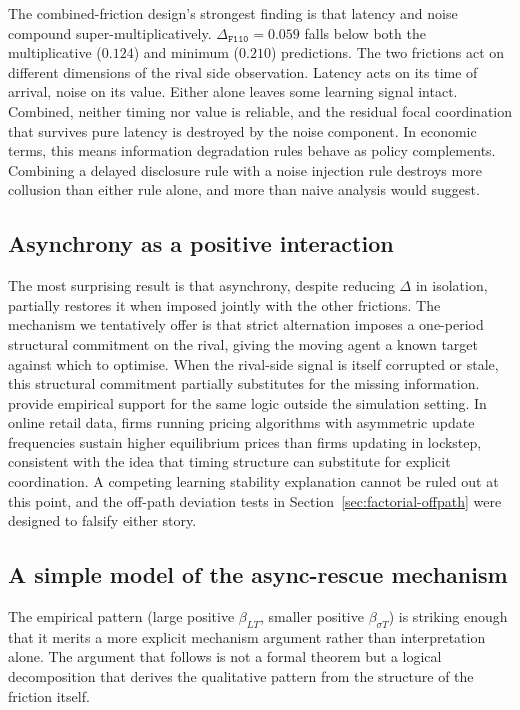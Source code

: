 The combined-friction design's strongest finding is that latency and noise compound super-multiplicatively. $\Delta_{\texttt{F110}} = 0.059$ falls below both the multiplicative ($0.124$) and minimum ($0.210$) predictions. The two frictions act on different dimensions of the rival side observation. Latency acts on its time of arrival, noise on its value. Either alone leaves some learning signal intact. Combined, neither timing nor value is reliable, and the residual focal coordination that survives pure latency is destroyed by the noise component. In economic terms, this means information degradation rules behave as policy complements. Combining a delayed disclosure rule with a noise injection rule destroys more collusion than either rule alone, and more than naive analysis would suggest.

\subsection{Asynchrony as a positive interaction}

The most surprising result is that asynchrony, despite reducing $\Delta$ in isolation, partially restores it when imposed jointly with the other frictions. The mechanism we tentatively offer is that strict alternation imposes a one-period structural commitment on the rival, giving the moving agent a known target against which to optimise. When the rival-side signal is itself corrupted or stale, this structural commitment partially substitutes for the missing information. \citet{brown2023} provide empirical support for the same logic outside the simulation setting. In online retail data, firms running pricing algorithms with asymmetric update frequencies sustain higher equilibrium prices than firms updating in lockstep, consistent with the idea that timing structure can substitute for explicit coordination. A competing learning stability explanation cannot be ruled out at this point, and the off-path deviation tests in Section~\ref{sec:factorial-offpath} were designed to falsify either story.

\subsection{A simple model of the async-rescue mechanism}
\label{sec:async-rescue-mechanism}

The empirical pattern (large positive $\beta_{LT}$, smaller positive $\beta_{\sigma T}$) is striking enough that it merits a more explicit mechanism argument rather than interpretation alone. The argument that follows is not a formal theorem but a logical decomposition that derives the qualitative pattern from the structure of the friction itself.

